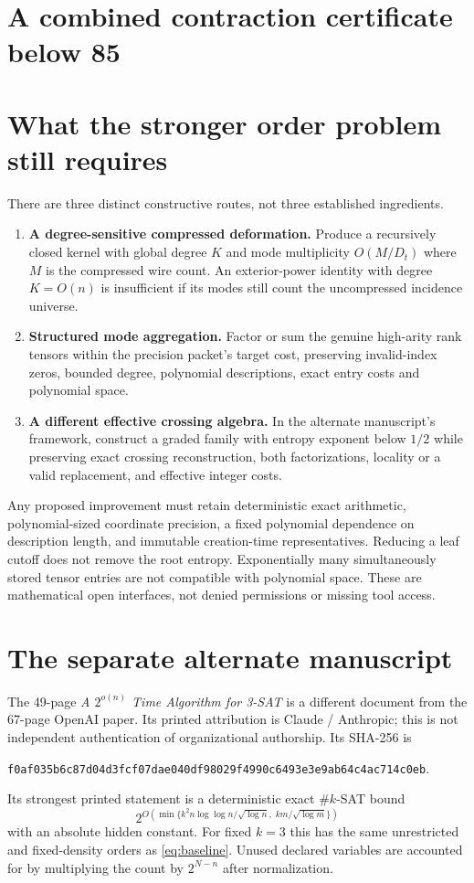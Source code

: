\documentclass[11pt,letterpaper]{article}
\newcommand{\Dt}{D_t}
\begin{document}
\section{A combined contraction certificate below 85}\label{sec:combined}


\section{What the stronger order problem still requires}\label{sec:frontier}
There are three distinct constructive routes, not three established ingredients.
\begin{enumerate}
\item \textbf{A degree-sensitive compressed deformation.} Produce a recursively closed
kernel with global degree $K$ and mode multiplicity $O(M/\Dt)$ where $M$ is the compressed
wire count. An exterior-power identity with degree $K=O(n)$ is insufficient if its modes
still count the uncompressed incidence universe.
\item \textbf{Structured mode aggregation.} Factor or sum the genuine high-arity rank tensors
within the precision packet's target cost, preserving invalid-index zeros, bounded degree,
polynomial descriptions, exact entry costs and polynomial space.
\item \textbf{A different effective crossing algebra.} In the alternate manuscript's framework,
construct a graded family with entropy exponent below $1/2$ while preserving exact crossing
reconstruction, both factorizations, locality or a valid replacement, and effective integer costs.
\end{enumerate}
Any proposed improvement must retain deterministic exact arithmetic, polynomial-sized
coordinate precision, a fixed polynomial dependence on description length, and immutable
creation-time representatives. Reducing a leaf cutoff does not remove the root entropy.
Exponentially many simultaneously stored tensor entries are not compatible with polynomial space.
These are mathematical open interfaces, not denied permissions or missing tool access.



\section{The separate alternate manuscript}\label{sec:alternate}
The 49-page \emph{A $2^{o(n)}$ Time Algorithm for 3-SAT} is a different document from the
67-page OpenAI paper. Its printed attribution is Claude / Anthropic; this is not independent
authentication of organizational authorship. Its SHA-256 is
\begin{center}\scriptsize\texttt{f0af035b6c87d04d3fcf07dae040df98029f4990c6493e3e9ab64c4ac714c0eb}.\end{center}
Its strongest printed statement is a deterministic exact \#{$k$}-SAT bound
\[
 2^{O\left(\min\{k^2n\log\log n/\sqrt{\log n},\;km/\sqrt{\log m}\}\right)}
\]
with an absolute hidden constant. For fixed $k=3$ this has the same unrestricted and
fixed-density orders as \eqref{eq:baseline}. Unused declared variables are accounted for
by multiplying the count by $2^{N-n}$ after normalization.
\end{document}
